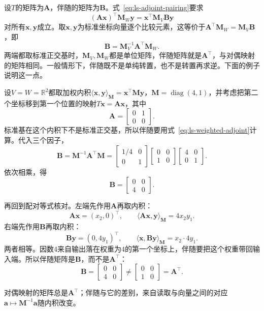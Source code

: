 设$T$的矩阵为$\bm A$，伴随的矩阵为$\bm B$。式~\eqref{eq:ls-adjoint-pairing}要求
\[
 (\bm A\bm x)^\top\bm M_W\bm y=\bm x^\top\bm M_V\bm B\bm y
\]
对所有$\bm x,\bm y$成立。取$\bm x,\bm y$为标准坐标向量逐个比较元素，这等价于$\bm A^\top\bm M_W=\bm M_V\bm B$，即
\begin{equation}
 \bm B=\bm M_V^{-1}\bm A^\top\bm M_W.
 \label{eq:ls-weighted-adjoint}
\end{equation}
两端都取标准正交基时，$\bm M_V,\bm M_W$都是单位矩阵，伴随矩阵就是$\bm A^\top$，与对偶映射的矩阵相同。一般情形下，伴随既不是单纯转置，也不是转置再求逆。下面的例子说明这一点。
\begin{example}[加权内积下的伴随]
\label{ex:ls-weighted-adjoint}
设$V=W=\mathbb R^2$都取加权内积$\langle\bm x,\bm y\rangle_{\bm M}=\bm x^\top\bm M\bm y$，$\bm M=\operatorname{diag}(4,1)$，并考虑把第二个坐标移到第一个位置的映射$T\bm x=\bm A\bm x$，其中
\[
 \bm A=\begin{bmatrix}0&1\\0&0\end{bmatrix}.
\]
标准基在这个内积下不是标准正交基，所以伴随要用式~\eqref{eq:ls-weighted-adjoint}计算。代入三个因子，
\[
 \bm B=\bm M^{-1}\bm A^\top\bm M
 =\begin{bmatrix}1/4&0\\0&1\end{bmatrix}\begin{bmatrix}0&0\\1&0\end{bmatrix}\begin{bmatrix}4&0\\0&1\end{bmatrix}.
\]
依次相乘，得
\[
 \bm B=\begin{bmatrix}0&0\\4&0\end{bmatrix}.
\]

再回到配对等式核对。左端先作用$\bm A$再取内积：
\[
 \bm A\bm x=(x_2,0)^\top,\qquad \langle\bm A\bm x,\bm y\rangle_{\bm M}=4x_2y_1 .
\]
右端先作用$\bm B$再取内积：
\[
 \bm B\bm y=(0,4y_1)^\top,\qquad \langle\bm x,\bm B\bm y\rangle_{\bm M}=x_2\cdot4y_1 .
\]
两者相等。因数$4$来自输出落在权重为$4$的第一个坐标上，伴随要把这个权重带回输入端。所以伴随矩阵是$\bm B$，而不是$\bm A^\top$：
\[
 \bm B=\begin{bmatrix}0&0\\4&0\end{bmatrix}\neq\begin{bmatrix}0&0\\1&0\end{bmatrix}=\bm A^\top.
\]
\end{example}
对偶映射的矩阵总是$\bm A^\top$；伴随与它的差别，来自读取与向量之间的对应$\bm a\mapsto\bm M^{-1}\bm a$随内积改变。

